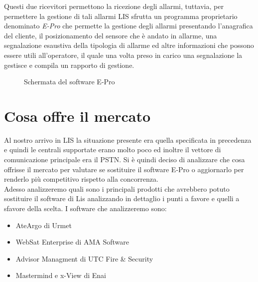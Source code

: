 Questi due ricevitori permettono la ricezione degli allarmi, tuttavia, per permettere la gestione di tali allarmi LIS sfrutta un programma proprietario denominato \emph{E-Pro} che permette la gestione degli allarmi presentando l'anagrafica del cliente, il posizionamento del sensore che è andato in allarme, una segnalazione esaustiva della tipologia di allarme ed altre informazioni che possono essere utili all'operatore, il quale una volta preso in carico una segnalazione la gestisce e compila un rapporto di gestione.
\begin{figure}
\centering
\caption{Schermata del software E-Pro}\label{fig:epro}
\end{figure}
\section{Cosa offre il mercato}
Al nostro arrivo in LIS la situazione presente era quella specificata in precedenza e quindi le centrali supportate erano molto poco ed inoltre il vettore di comunicazione principale era il PSTN. Si è quindi deciso di analizzare che cosa offrisse il mercato per valutare se sostituire il software E-Pro o aggiornarlo per renderlo più competitivo rispetto alla concorrenza.\\
Adesso analizzeremo quali sono i principali prodotti che avrebbero potuto sostituire il software di Lis analizzando in dettaglio i punti a favore e quelli a sfavore della scelta.
I software che analizzeremo sono:
\begin{itemize}
	\item AteArgo di Urmet
	\item WebSat Enterprise di AMA Software
	\item Advisor Managment di UTC Fire \& Security
	\item Mastermind e x-View di Enai
\end{itemize}
